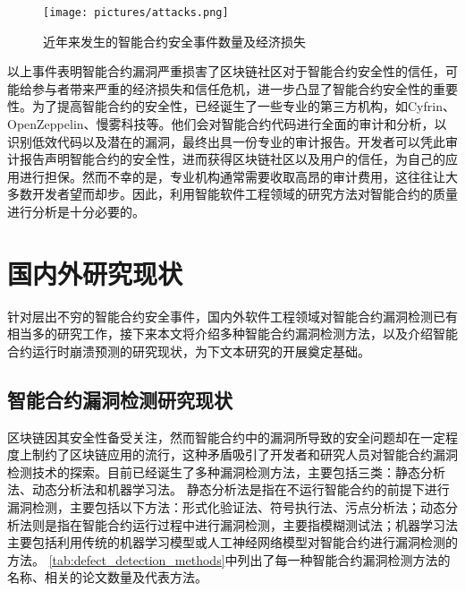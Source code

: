 \begin{figure}[htbp]
    \centering
    \texttt{[image: pictures/attacks.png]}
    \caption{\label{fig:attacks_events}近年来发生的智能合约安全事件数量及经济损失}
\end{figure}
    
以上事件表明智能合约漏洞严重损害了区块链社区对于智能合约安全性的信任，可能给参与者带来严重的经济损失和信任危机，进一步凸显了智能合约安全性的重要性。为了提高智能合约的安全性，已经诞生了一些专业的第三方机构，如Cyfrin、OpenZeppelin、慢雾科技等。他们会对智能合约代码进行全面的审计和分析，以识别低效代码以及潜在的漏洞，最终出具一份专业的审计报告。开发者可以凭此审计报告声明智能合约的安全性，进而获得区块链社区以及用户的信任，为自己的应用进行担保。然而不幸的是，专业机构通常需要收取高昂的审计费用，这往往让大多数开发者望而却步。因此，利用智能软件工程领域的研究方法对智能合约的质量进行分析是十分必要的。




\section{国内外研究现状}
\label{sec:国内外研究现状}
针对层出不穷的智能合约安全事件，国内外软件工程领域对智能合约漏洞检测已有相当多的研究工作，接下来本文将介绍多种智能合约漏洞检测方法，以及介绍智能合约运行时崩溃预测的研究现状，为下文本研究的开展奠定基础。
\subsection{智能合约漏洞检测研究现状}
\label{sec:智能合约漏洞检测研究现状}
区块链因其安全性备受关注，然而智能合约中的漏洞所导致的安全问题却在一定程度上制约了区块链应用的流行，这种矛盾吸引了开发者和研究人员对智能合约漏洞检测技术的探索。目前已经诞生了多种漏洞检测方法，主要包括三类：静态分析法、动态分析法和机器学习法。
静态分析法是指在不运行智能合约的前提下进行漏洞检测，主要包括以下方法：形式化验证法、符号执行法、污点分析法；动态分析法则是指在智能合约运行过程中进行漏洞检测，主要指模糊测试法；机器学习法主要包括利用传统的机器学习模型或人工神经网络模型对智能合约进行漏洞检测的方法。
\autoref{tab:defect_detection_methods}中列出了每一种智能合约漏洞检测方法的名称、相关的论文数量及代表方法。

